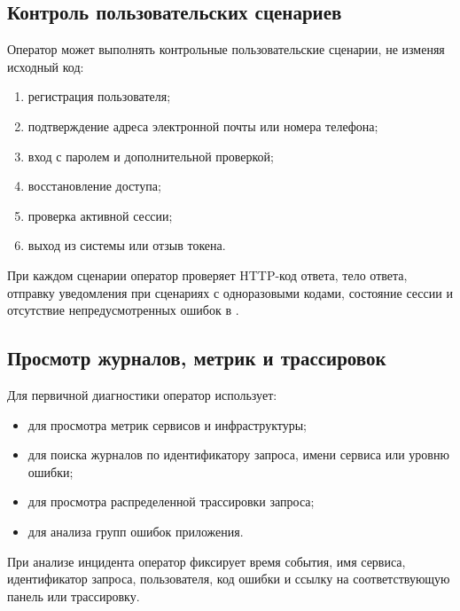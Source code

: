 \documentclass[12pt,a4paper]{extarticle}
\begin{document}
\subsection{Контроль пользовательских сценариев}

\begin{hseExample}
Оператор может выполнять контрольные пользовательские сценарии, не изменяя исходный код:

\begin{enumerate}[label=\arabic*), leftmargin=1.25cm]
    \item регистрация пользователя;
    \item подтверждение адреса электронной почты или номера телефона;
    \item вход с паролем и дополнительной проверкой;
    \item восстановление доступа;
    \item проверка активной сессии;
    \item выход из системы или отзыв токена.
\end{enumerate}

При каждом сценарии оператор проверяет HTTP-код ответа, тело ответа, отправку уведомления при сценариях с одноразовыми кодами, состояние сессии и отсутствие непредусмотренных ошибок в .
\end{hseExample}

\subsection{Просмотр журналов, метрик и трассировок}

\begin{hseExample}
Для первичной диагностики оператор использует:

\begin{itemize}[leftmargin=1.25cm]
    \item {} для просмотра метрик сервисов и инфраструктуры;
    \item {} для поиска журналов по идентификатору запроса, имени сервиса или уровню ошибки;
    \item {} для просмотра распределенной трассировки запроса;
    \item {} для анализа групп ошибок приложения.
\end{itemize}

При анализе инцидента оператор фиксирует время события, имя сервиса, идентификатор запроса, пользователя, код ошибки и ссылку на соответствующую панель или трассировку.
\end{hseExample}
\end{document}
